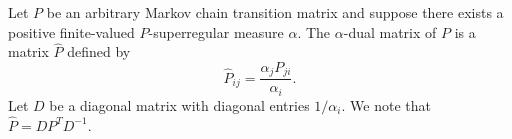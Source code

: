 Let $P$ be an arbitrary Markov chain transition matrix and suppose there exists a positive finite-valued $P$-superregular measure $\alpha$. The $\alpha$-dual matrix of $P$ is a matrix $\hat{P}$ defined by
$$\hat{P}_{ij} = \frac{\alpha_j P_{ji}}{\alpha_i}.$$
Let $D$ be a diagonal matrix with diagonal entries $1/\alpha_i$. We note that $\hat{P} = D P^T D^{-1}$.
